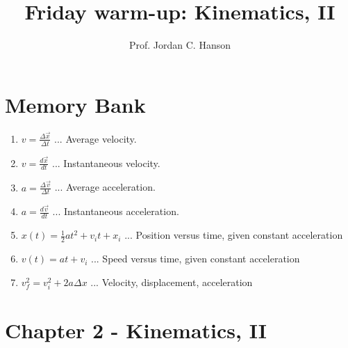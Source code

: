 \documentclass{article}
\begin{document}
\twocolumn

\title{Friday warm-up: Kinematics, II}
\author{Prof. Jordan C. Hanson}

\maketitle

\section{Memory Bank}

\begin{enumerate}
\item $v = \frac{\Delta \vec{x}}{\Delta t}$ ... Average velocity.
\item $v = \frac{d\vec{x}}{dt}$ ... Instantaneous velocity.
\item $a = \frac{\Delta \vec{v}}{\Delta t}$ ... Average acceleration.
\item $a = \frac{d\vec{v}}{dt}$ ... Instantaneous acceleration.
\item $x(t) = \frac{1}{2}at^2 + v_i t + x_i$ ... Position versus time, given constant acceleration
\item $v(t) = at + v_i$ ... Speed versus time, given constant acceleration
\item $v_f^2 = v_i^2 + 2 a \Delta x$ ... Velocity, displacement, acceleration
\end{enumerate}

\section{Chapter 2 - Kinematics, II}
\end{document}
